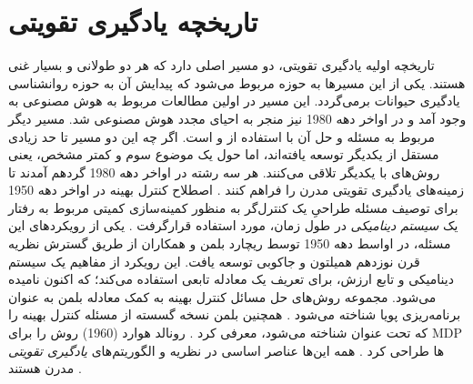 

\section{تاریخچه یادگیری تقویتی}
تاریخچه اولیه یادگیری تقویتی، دو مسیر اصلی دارد که هر دو طولانی و بسیار غنی هستند. یکی از این مسیرها به حوزه  مربوط می‌شود که پیدایش آن به حوزه روانشناسی یادگیری حیوانات برمی‌گردد. این مسیر در اولین مطالعات مربوط به هوش مصنوعی به وجود آمد و در اواخر دهه 1980 نیز منجر به احیای مجدد هوش مصنوعی شد. مسیر دیگر مربوط به مسئله 
\textit{}
و حل آن با استفاده از
\textit{
}
  و
\textit{}
    است. اگر چه این دو مسیر تا حد زیادی مستقل از یکدیگر توسعه یافته‌اند،  اما حول یک موضوع سوم و کمتر مشخص، یعنی روش‌های 
\textit{} با یکدیگر تلاقی می‌کنند. هر سه رشته در اواخر دهه 1980 گرد‌هم آمدند تا زمینه‌های یادگیری تقویتی مدرن را فراهم کنند
 \cite{suttonbook}.
اصطلاح کنترل بهینه
در اواخر دهه 1950
برای توصیف مسئله طراحیِ یک کنترل‌گر به منظور کمینه‌سازی کمیتی مربوط به رفتار یک \textit{سیستم دینامیکی} در طول زمان، مورد استفاده قرارگرفت
\cite{mldef}.
 یکی از رویکردهای این مسئله، در اواسط دهه 1950 توسط ریچارد بلمن و همکاران از طریق گسترش نظریه قرن نوزدهم همیلتون و جاکوبی
 توسعه یافت. این رویکرد از مفاهیم 
\textit{}
 یک سیستم دینامیکی و تابع ارزش، برای تعریف یک معادله تابعی استفاده می‌کند؛ که اکنون 
 \textit{
 }نامیده می‌شود. مجموعه روش‌های حل مسائل کنترل بهینه به کمک معادله بلمن به عنوان برنامه‌ریزی پویا شناخته می‌شود
  \cite{bellman1957dynamic}.
   همچنین بلمن نسخه گسسته از مسئله کنترل بهینه را که تحت عنوان 
  \textit{
}
شناخته می‌شود، معرفی کرد
\cite{bellman1957markovian}.
 رونالد هوارد (1960) روش 
\textit{
	}
را برای MDP‌‌ ها طراحی کرد
\cite{howard1960dynamic}. 
همه این‌ها عناصر اساسی در نظریه و الگوریتم‌های \textit{یادگیری تقویتی} مدرن هستند
\cite{suttonbook}.

